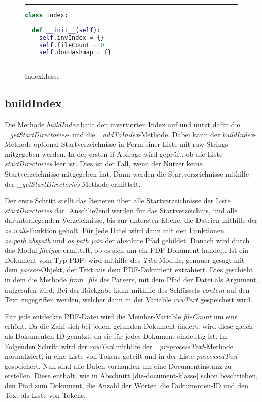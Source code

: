 \begin{figure}
	\rule{\textwidth}{0.4pt}
		\begin{lstlisting}[language=Python]
class Index:
  
  def __init__(self):
    self.invIndex = {}
    self.fileCount = 0
    self.docHashmap = {}
		\end{lstlisting}
	\rule{\textwidth}{0.4pt}
	\caption{Indexklasse}
	\label{fig:index}
\end{figure}

\subsection{buildIndex}\label{buildindex}

Die Methode \emph{buildIndex} baut den invertierten Index auf und nutzt dafür die\\
\textit{\_getStartDirectories}- und die \textit{\_addToIndex}-Methode. Dabei kann der \textit{buildIndex}-Methode optional Startverzeichnisse in Form einer Liste mit raw Strings mitgegeben werden. In der ersten If-Abfrage wird geprüft, ob die Liste \textit{startDirectories} leer ist. Dies ist der Fall, wenn der Nutzer keine Startverzeichnisse mitgegeben hat. Dann werden die Startverzeichnisse mithilfe der \textit{\_getStartDirectories}-Methode ermittelt.

Der erste Schritt stellt das Iterieren über alle Startverzeichnisse der Liste \textit{startDirectories} dar. Anschließend werden für das Startverzeichnis, und alle darunterliegenden Verzeichnisse, bis zur untersten Ebene, die Dateien mithilfe der \textit{os.walk}-Funktion geholt. Für jede Datei wird dann mit den Funktionen \textit{os.path.abspath} und \textit{os.path.join} der absolute Pfad gebildet. Danach wird durch das Modul \textit{filetype} ermittelt, ob es sich um ein PDF-Dokument handelt. Ist ein Dokument vom Typ PDF, wird mithilfe des \textit{Tika}-Moduls, genauer gesagt mit dem \textit{parser}-Objekt, der Text aus dem PDF-Dokument extrahiert. Dies geschieht in dem die Methode \textit{from\_file} des Parsers, mit dem Pfad der Datei als Argument, aufgerufen wird. Bei der Rückgabe kann mithilfe des Schlüssels \textit{content} auf den Text zugegriffen werden, welcher dann in der Variable \textit{rawText} gespeichert wird.

Für jede entdeckte PDF-Datei wird die Member-Variable \textit{fileCount} um eins erhöht. Da die Zahl sich bei jedem gefunden Dokument ändert, wird diese gleich als Dokumenten-ID genutzt, da sie für jedes Dokument eindeutig ist. Im Folgenden Schritt wird der \textit{rawText} mithilfe der \textit{\_preprocessText}-Methode normalisiert, in eine Liste von Tokens geteilt und in der Liste \textit{processedText} gespeichert. Nun sind alle Daten vorhanden um eine Documentinstanz zu erstellen. Diese enthält, wie in Abschnitt \ref{die-document-klasse} schon beschrieben, den Pfad zum Dokument, die Anzahl der Wörter, die Dokumenten-ID und den Text als Liste von Tokens.

